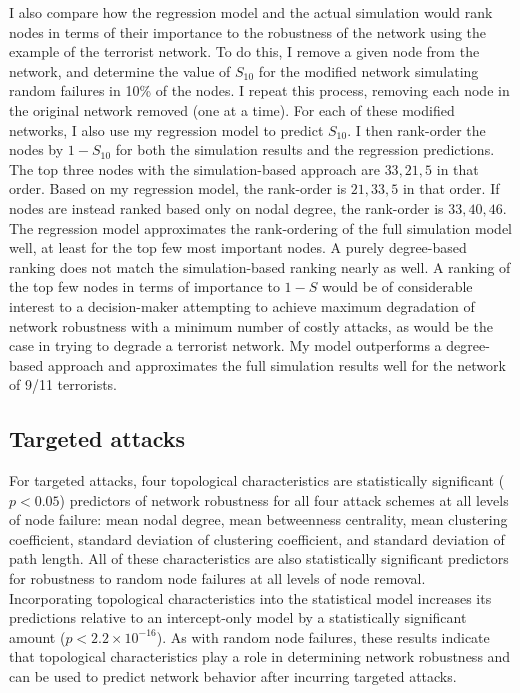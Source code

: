I also compare how the regression model and the actual simulation would rank nodes in terms of their importance to the robustness of the network using the example of the terrorist network. To do this, I remove a given node from the network, and determine the value of $S_{10}$ for the modified network simulating random failures in 10\% of the nodes. I repeat this process, removing each node in the original network removed (one at a time). For each of these modified networks, I also use my regression model to predict $S_{10}$. I then rank-order the nodes by $1-S_{10}$ for both the simulation results and the regression predictions. The top three nodes with the simulation-based approach are $33, 21, 5$ in that order. Based on my regression model, the rank-order is $21, 33, 5$ in that order. If nodes are instead ranked based only on nodal degree, the rank-order is $33, 40, 46$. The regression model approximates the rank-ordering of the full simulation model well, at least for the top few most important nodes. A purely degree-based ranking does not match the simulation-based ranking nearly as well. A ranking of the top few nodes in terms of importance to $1-S$ would be of considerable interest to a decision-maker attempting to achieve maximum degradation of network robustness with a minimum number of costly attacks, as would be the case in trying to degrade a terrorist network. My model outperforms a degree-based approach and approximates the full simulation results well for the network of 9/11 terrorists.


\subsection{Targeted attacks}
\label{sec:ch2:results:targeted}

For targeted attacks, four topological characteristics are statistically significant ($p < 0.05$) predictors of network robustness for all four attack schemes at all levels of node failure: mean nodal degree, mean betweenness centrality, mean clustering coefficient, standard deviation of clustering coefficient, and standard deviation of path length.  All of these characteristics are also statistically significant predictors for robustness to random node failures at all levels of node removal.  Incorporating topological characteristics into the statistical model increases its predictions relative to an intercept-only model by a statistically significant amount ($p < 2.2 \times 10^{-16}$). As with random node failures, these results indicate that topological characteristics play a role in determining network robustness and can be used to predict network behavior after incurring targeted attacks.

